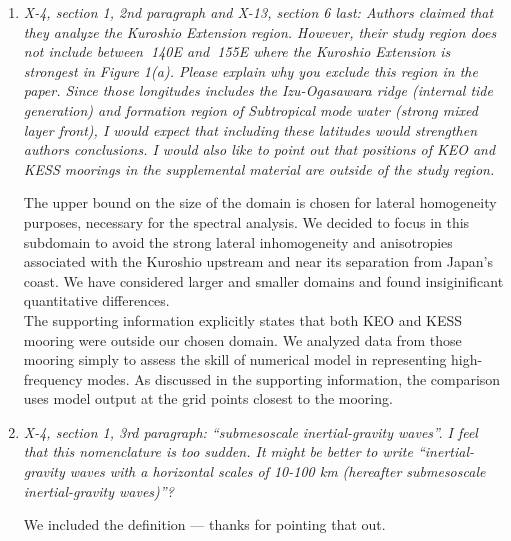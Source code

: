 \documentclass[11pt]{article}
\newcommand{\bdp}{\begin{description}}
\newcommand{\edp}{\end{description}}
\begin{document}
\begin{enumerate}

  \item {\it X-4, section 1, 2nd paragraph and X-13, section 6 last: Authors claimed that they
        analyze the Kuroshio Extension region. However, their study region does not
        include between $~$140E and $~$155E where the Kuroshio Extension is strongest in
        Figure 1(a). Please explain why you exclude this region in the paper. Since those
        longitudes includes the Izu-Ogasawara ridge (internal tide generation) and
        formation region of Subtropical mode water (strong mixed layer front), I would
        expect that including these latitudes would strengthen authors conclusions. I
        would also like to point out that positions of KEO and KESS moorings in the
        supplemental material are outside of the study region.}\\

        \bdp
             The upper bound on
             the size of the domain is chosen for lateral homogeneity purposes,
             necessary for the spectral analysis. We decided to focus in
             this subdomain to avoid the strong lateral inhomogeneity and
             anisotropies associated
             with the Kuroshio upstream and near its separation from Japan's coast.
             We have considered larger and smaller domains and found insiginificant
             quantitative differences.\\

             The supporting information explicitly states that both KEO and KESS
             mooring were outside our chosen domain. We analyzed data from those
             mooring simply to assess the skill of numerical model in representing
             high-frequency modes. As discussed in the supporting information, the
             comparison uses model output at the grid points closest
             to the mooring.
        \edp

  \item {\it X-4, section 1, 3rd paragraph: “submesoscale inertial-gravity waves”. I feel that this
        nomenclature is too sudden. It might be better to write “inertial-gravity waves
        with a horizontal scales of 10-100 km (hereafter submesoscale inertial-gravity
        waves)”?}\\

        \bdp
          We included the definition --- thanks for pointing that out.
        \edp


\end{enumerate}
\end{document}
